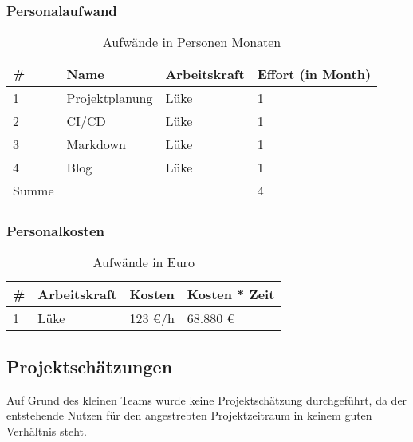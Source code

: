 \subsubsection{ Personalaufwand }

\begin{table}[H]
    \begin{tabular}{|l|l|l|l|}
    \hline
    \# & \textbf{Name}    & \textbf{Arbeitskraft} & \textbf{Effort (in Month)}        \\ \hline
    1  &  Projektplanung  &     Lüke              &          1              \\ \hline
    2  &  CI/CD           &     Lüke              &          1              \\ \hline
    3  &  Markdown        &     Lüke              &          1              \\ \hline
    4  &  Blog            &     Lüke              &          1              \\ \hline
    Summe  &              &                   &          4             \\ \hline
    \end{tabular}
    \caption{Aufwände in Personen Monaten}
    \label{tab:PersonenMonate}
\end{table}


\subsubsection{ Personalkosten }

\begin{table}[H]
    \begin{tabular}{|l|l|l|l|}
    \hline
    \# & \textbf{Arbeitskraft}    & \textbf{Kosten} & \textbf{ Kosten * Zeit }        \\ \hline
    1  &  Lüke          &     123 €/h     &          68.880 €             \\ \hline
   
    \end{tabular}
    \caption{Aufwände in Euro}
    \label{tab:Kosten}
\end{table}
 
\subsection{ Projektschätzungen }
Auf Grund des kleinen Teams wurde keine Projektschätzung durchgeführt, da der
entstehende Nutzen für den angestrebten Projektzeitraum in keinem guten Verhältnis steht.

